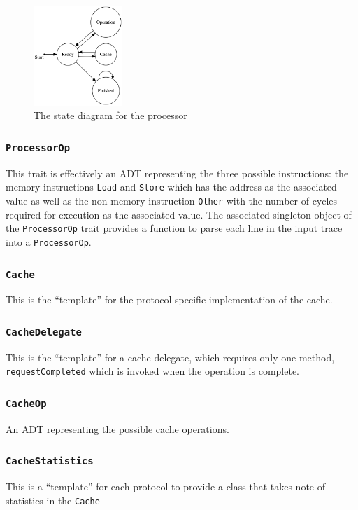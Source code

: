 \documentclass[nonacm,acmsmall,screen,11pt]{acmart}
\begin{document}
\begin{figure}[hptb]
  \centering
  \includegraphics[width=0.3\textwidth]{processor}
  \caption{The state diagram for the processor}
  \label{fig:processor}
\end{figure}

\subsubsection{\texttt{ProcessorOp}}
This trait is effectively an ADT representing the three possible instructions: the memory instructions \texttt{Load} and \texttt{Store} which has the address as the associated value as well as the non-memory instruction \texttt{Other} with the number of cycles required for execution as the associated value.
The associated singleton object of the \texttt{ProcessorOp} trait provides a function to parse each line in the input trace into a \texttt{ProcessorOp}.

\subsubsection{\texttt{Cache}}
This is the ``template'' for the protocol-specific implementation of the cache.
\subsubsection{\texttt{CacheDelegate}}
This is the ``template'' for a cache delegate, which requires only one method, \texttt{requestCompleted} which is invoked when the operation is complete.

\subsubsection{\texttt{CacheOp}}
An ADT representing the possible cache operations.

\subsubsection{\texttt{CacheStatistics}}
This is a ``template'' for each protocol to provide a class that takes note of statistics in the \texttt{Cache}
\end{document}
